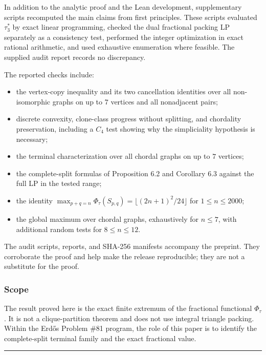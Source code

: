 \documentclass[
  american,
  11pt,
  a4paper,
]{article}
\providecommand{\tightlist}{%
  \setlength{\itemsep}{0pt}\setlength{\parskip}{0pt}}
\begin{document}
In addition to the analytic proof and the Lean development, supplementary scripts recomputed the main claims from first principles. These scripts evaluated \(\tau_3^*\) by exact linear programming, checked the dual fractional packing LP separately as a consistency test, performed the integer optimization in exact rational arithmetic, and used exhaustive enumeration where feasible. The supplied audit report records no discrepancy.

The reported checks include:

\begin{itemize}
\tightlist
\item
  the vertex-copy inequality and its two cancellation identities over all non-isomorphic graphs on up to \(7\) vertices and all nonadjacent pairs;
\item
  discrete convexity, clone-class progress without splitting, and chordality preservation, including a \(C_4\) test showing why the simpliciality hypothesis is necessary;
\item
  the terminal characterization over all chordal graphs on up to \(7\) vertices;
\item
  the complete-split formulas of Proposition 6.2 and Corollary 6.3 against the full LP in the tested range;
\item
  the identity \(\max_{p+q=n}\Phi_\tau(S_{p,q})=\lfloor(2n+1)^2/24\rfloor\) for \(1\le n\le2000\);
\item
  the global maximum over chordal graphs, exhaustively for \(n\le7\), with additional random tests for \(8\le n\le12\).
\end{itemize}

The audit scripts, reports, and SHA-256 manifests accompany the preprint. They corroborate the proof and help make the release reproducible; they are not a substitute for the proof.

\subsubsection{Scope}\label{scope}

The result proved here is the exact finite extremum of the fractional functional \(\Phi_\tau\). It is not a clique-partition theorem and does not use integral triangle packing. Within the Erdős Problem \#81 program, the role of this paper is to identify the complete-split terminal family and the exact fractional value.

\begin{center}\rule{0.5\linewidth}{0.5pt}\end{center}
\end{document}
